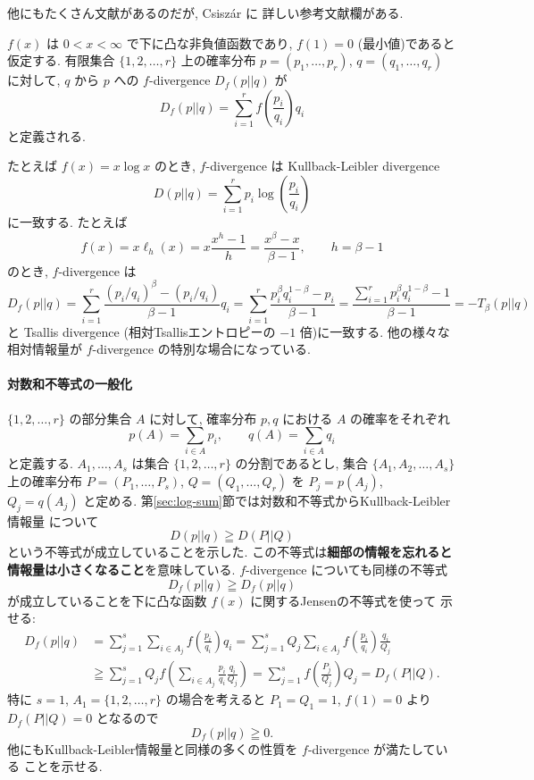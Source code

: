 \documentclass[12pt,twoside]{jarticle}
\theoremstyle{jplain}
\theoremstyle{jplain}
\theoremstyle{jplain}
\numberwithin{theorem}{section}
\numberwithin{equation}{section}
\numberwithin{figure}{section}
\numberwithin{table}{section}
\newcommand\secref[1]{第\ref{#1}節}
\begin{document}
他にもたくさん文献があるのだが, Csisz\'ar \cite{Csiszar2008} に
詳しい参考文献欄がある.

$f(x)$ は $0<x<\infty$ で下に凸な非負値函数であり, $f(1)=0$ (最小値)であると仮定する.
有限集合 $\{1,2,\ldots,r\}$ 上の確率分布 $p=(p_1,\ldots,p_r)$,
$q=(q_1,\ldots,q_r)$ に対して, $q$ から $p$ への $f$-divergence $D_f(p||q)$ が
\[
D_f(p||q)=\sum_{i=1}^r f\left(\frac{p_i}{q_i}\right)q_i
\]
と定義される.

たとえば $f(x)=x\log x$ のとき, $f$-divergence は Kullback-Leibler divergence
\[
D(p||q)=\sum_{i=1}^r p_i\log\left(\frac{p_i}{q_i}\right)
\]
に一致する. たとえば
\[
f(x)=x\ell_h(x)=x\frac{x^h-1}{h}=\frac{x^\beta-x}{\beta-1},
\qquad h=\beta-1
\]
のとき, $f$-divergence は
\[
D_f(p||q)
=\sum_{i=1}^r\frac{(p_i/q_i)^\beta-(p_i/q_i)}{\beta-1}q_i
=\sum_{i=1}^r\frac{p_i^\beta q_i^{1-\beta}-p_i}{\beta-1}
=\frac{\sum_{i=1}^r p_i^\beta q_i^{1-\beta}-1}{\beta-1}
=-T_\beta(p||q)
\]
と Tsallis divergence (相対Tsallisエントロピーの $-1$ 倍)に一致する.
他の様々な相対情報量が $f$-divergence の特別な場合になっている.

\paragraph{対数和不等式の一般化}
$\{1,2,\ldots,r\}$ の部分集合 $A$ に対して,
確率分布 $p,q$ における $A$ の確率をそれぞれ
\[
p(A) = \sum_{i\in A} p_i, \qquad
q(A) = \sum_{i\in A} q_i
\]
と定義する. $A_1,\ldots,A_s$ は集合 $\{1,2,\ldots,r\}$ の分割であるとし,
集合 $\{A_1,A_2,\ldots,A_s\}$ 上の確率分布
$P=(P_1,\ldots,P_s)$, $Q=(Q_1,\ldots,Q_r)$ を $P_j=p(A_j)$, $Q_j=q(A_j)$
と定める. \secref{sec:log-sum}では対数和不等式からKullback-Leibler情報量
について
\[
D(p||q)\geqq D(P||Q)
\]
という不等式が成立していることを示した.
この不等式は{\bfseries 細部の情報を忘れると情報量は小さくなること}を意味している.
$f$-divergence についても同様の不等式
\[
D_f(p||q)\geqq D_f(p||q)
\]
が成立していることを下に凸な函数 $f(x)$ に関するJensenの不等式を使って
示せる:
\begin{align*}
D_f(p||q)
&
=\sum_{j=1}^s\sum_{i\in A_j} f\left(\frac{p_i}{q_i}\right)q_i
=\sum_{j=1}^s Q_j \sum_{i\in A_j} f\left(\frac{p_i}{q_i}\right)\frac{q_i}{Q_j}
\\ &
\geqq\sum_{j=1}^s Q_j f\left(\sum_{i\in A_j}\frac{p_i}{q_i}\frac{q_i}{Q_j}\right)
=\sum_{j=1}^s f\left(\frac{P_j}{Q_j}\right)Q_j
=D_f(P||Q).
\end{align*}
特に $s=1$, $A_1=\{1,2,\ldots,r\}$ の場合を考えると $P_1=Q_1=1$, $f(1)=0$
より $D_f(P||Q)=0$ となるので
\[
D_f(p||q)\geqq 0.
\]
他にもKullback-Leibler情報量と同様の多くの性質を $f$-divergence が満たしている
ことを示せる.
\end{document}
